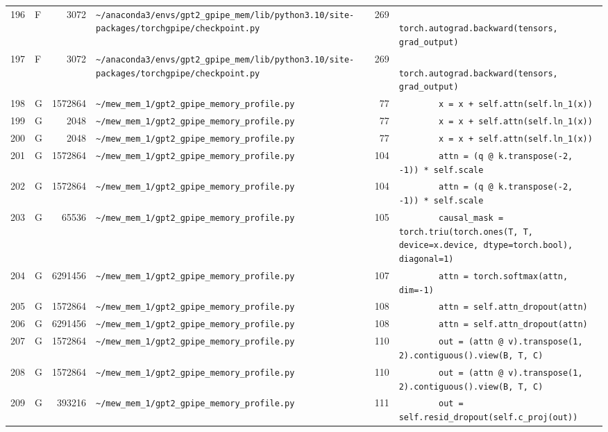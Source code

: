 \documentclass{article}
\begin{document}
\begin{longtable}{r l r p{6.5cm} r p{7.0cm}}
196 & F & 3072 & \lstinline|~/anaconda3/envs/gpt2_gpipe_mem/lib/python3.10/site-packages/torchgpipe/checkpoint.py| & 269 & \lstinline|            torch.autograd.backward(tensors, grad_output)| \\
197 & F & 3072 & \lstinline|~/anaconda3/envs/gpt2_gpipe_mem/lib/python3.10/site-packages/torchgpipe/checkpoint.py| & 269 & \lstinline|            torch.autograd.backward(tensors, grad_output)| \\
198 & G & 1572864 & \lstinline|~/mew_mem_1/gpt2_gpipe_memory_profile.py| & 77 & \lstinline|        x = x + self.attn(self.ln_1(x))| \\
199 & G & 2048 & \lstinline|~/mew_mem_1/gpt2_gpipe_memory_profile.py| & 77 & \lstinline|        x = x + self.attn(self.ln_1(x))| \\
200 & G & 2048 & \lstinline|~/mew_mem_1/gpt2_gpipe_memory_profile.py| & 77 & \lstinline|        x = x + self.attn(self.ln_1(x))| \\
201 & G & 1572864 & \lstinline|~/mew_mem_1/gpt2_gpipe_memory_profile.py| & 104 & \lstinline|        attn = (q @ k.transpose(-2, -1)) * self.scale| \\
202 & G & 1572864 & \lstinline|~/mew_mem_1/gpt2_gpipe_memory_profile.py| & 104 & \lstinline|        attn = (q @ k.transpose(-2, -1)) * self.scale| \\
203 & G & 65536 & \lstinline|~/mew_mem_1/gpt2_gpipe_memory_profile.py| & 105 & \lstinline|        causal_mask = torch.triu(torch.ones(T, T, device=x.device, dtype=torch.bool), diagonal=1)| \\
204 & G & 6291456 & \lstinline|~/mew_mem_1/gpt2_gpipe_memory_profile.py| & 107 & \lstinline|        attn = torch.softmax(attn, dim=-1)| \\
205 & G & 1572864 & \lstinline|~/mew_mem_1/gpt2_gpipe_memory_profile.py| & 108 & \lstinline|        attn = self.attn_dropout(attn)| \\
206 & G & 6291456 & \lstinline|~/mew_mem_1/gpt2_gpipe_memory_profile.py| & 108 & \lstinline|        attn = self.attn_dropout(attn)| \\
207 & G & 1572864 & \lstinline|~/mew_mem_1/gpt2_gpipe_memory_profile.py| & 110 & \lstinline|        out = (attn @ v).transpose(1, 2).contiguous().view(B, T, C)| \\
208 & G & 1572864 & \lstinline|~/mew_mem_1/gpt2_gpipe_memory_profile.py| & 110 & \lstinline|        out = (attn @ v).transpose(1, 2).contiguous().view(B, T, C)| \\
209 & G & 393216 & \lstinline|~/mew_mem_1/gpt2_gpipe_memory_profile.py| & 111 & \lstinline|        out = self.resid_dropout(self.c_proj(out))| \\

\end{longtable}
\end{document}
